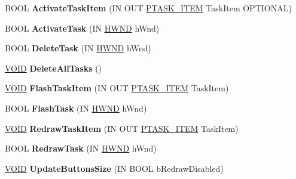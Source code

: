 \begin{DoxyCompactItemize}
B\+O\+OL {\bfseries Activate\+Task\+Item} (IN O\+UT \hyperlink{struct___t_a_s_k___i_t_e_m}{P\+T\+A\+S\+K\+\_\+\+I\+T\+EM} Task\+Item O\+P\+T\+I\+O\+N\+AL)
\item 
\mbox{\label{class_c_task_switch_wnd_a7bf2b2e463b210732fc26984575bfd23}} 
B\+O\+OL {\bfseries Activate\+Task} (IN \hyperlink{interfacevoid}{H\+W\+ND} h\+Wnd)
\item 
\mbox{\label{class_c_task_switch_wnd_adfccab43aa98c376da4ff66c2111239a}} 
B\+O\+OL {\bfseries Delete\+Task} (IN \hyperlink{interfacevoid}{H\+W\+ND} h\+Wnd)
\item 
\mbox{\label{class_c_task_switch_wnd_a8761f8a43b7b43b681858f1224bac42e}} 
\hyperlink{interfacevoid}{V\+O\+ID} {\bfseries Delete\+All\+Tasks} ()
\item 
\mbox{\label{class_c_task_switch_wnd_a636e6232ef5bc8c8212e8e66a295c8e8}} 
\hyperlink{interfacevoid}{V\+O\+ID} {\bfseries Flash\+Task\+Item} (IN O\+UT \hyperlink{struct___t_a_s_k___i_t_e_m}{P\+T\+A\+S\+K\+\_\+\+I\+T\+EM} Task\+Item)
\item 
\mbox{\label{class_c_task_switch_wnd_a6bd7bd145543c6072fc4552968869d08}} 
B\+O\+OL {\bfseries Flash\+Task} (IN \hyperlink{interfacevoid}{H\+W\+ND} h\+Wnd)
\item 
\mbox{\label{class_c_task_switch_wnd_a0bfd2038b56742560005b95b7320d6be}} 
\hyperlink{interfacevoid}{V\+O\+ID} {\bfseries Redraw\+Task\+Item} (IN O\+UT \hyperlink{struct___t_a_s_k___i_t_e_m}{P\+T\+A\+S\+K\+\_\+\+I\+T\+EM} Task\+Item)
\item 
\mbox{\label{class_c_task_switch_wnd_a910077fbdfd998b857eb120078a45587}} 
B\+O\+OL {\bfseries Redraw\+Task} (IN \hyperlink{interfacevoid}{H\+W\+ND} h\+Wnd)
\item 
\mbox{\label{class_c_task_switch_wnd_a1e9544ba5062d555465143ed21d94b23}} 
\hyperlink{interfacevoid}{V\+O\+ID} {\bfseries Update\+Buttons\+Size} (IN B\+O\+OL b\+Redraw\+Disabled)
\item 
\mbox{\label{class_c_task_switch_wnd_aac60b5d82a0d8c8e1226705ae798cb70}} 

\end{DoxyCompactItemize}
